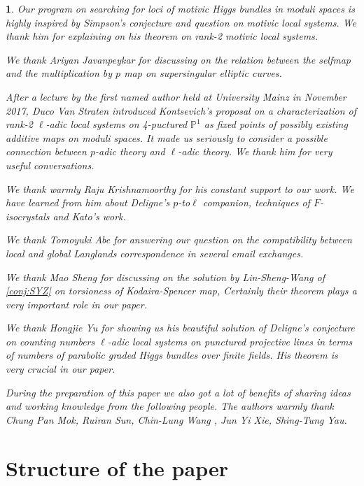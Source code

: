 \documentclass[12pt,twoside]{book}
\theoremstyle{plain}
\newtheorem*{acknowledgement*}{\protect \acknowledgementname}
\providecommand{\acknowledgementname}{Acknowledgement}
\theoremstyle{definition}
\theoremstyle{remark}
\numberwithin{equation}{section}
\begin{document}
\begin{acknowledgement*} Our program on searching  for loci of motivic Higgs bundles in  moduli spaces is highly inspired by Simpson's conjecture and question on motivic local systems. We thank him for explaining on his theorem on rank-2 motivic local systems.

We thank Ariyan Javanpeykar for discussing on the relation between the selfmap and the multiplication by $p$ map on supersingular elliptic curves.

After a lecture by the first named author held  at University Mainz in November 2017, Duco Van Straten  introduced Kontsevich's proposal on a characterization of   rank-2 $\ell$-adic local systems  on 4-puctured $\mathbb P^1$  as fixed points of possibly existing additive maps on moduli spaces. It made us seriously to consider a possible connection between $p$-adic theory and $\ell$-adic theory. We thank him for very useful conversations.

 We thank warmly Raju Krishnamoorthy for  his constant support to our work. We have learned from him about Deligne's $p$-to$\ell$ companion, techniques of $F$-isocrystals  and Kato's work.

We  thank Tomoyuki Abe for answering our question on the compatibility between local and global Langlands correspondence in several email exchanges.

We thank Mao Sheng for discussing on the solution by Lin-Sheng-Wang of  \autoref{conj:SYZ} on torsioness of Kodaira-Spencer map, Certainly their  theorem plays a very important role in our paper.

We thank Hongjie Yu for showing us his beautiful solution of Deligne's conjecture on counting numbers $\ell$-adic local systems on punctured projective lines in terms of numbers of parabolic graded Higgs bundles over finite fields. His theorem is  very crucial in our paper.

During the preparation of this paper we also got a lot of benefits of sharing ideas and working knowledge from the following people.  The authors warmly thank Chung Pan Mok,  Ruiran Sun, Chin-Lung Wang , Jun Yi Xie, 
Shing-Tung Yau.
\end{acknowledgement*}



\section*{\bf Structure of the paper}
\end{document}
